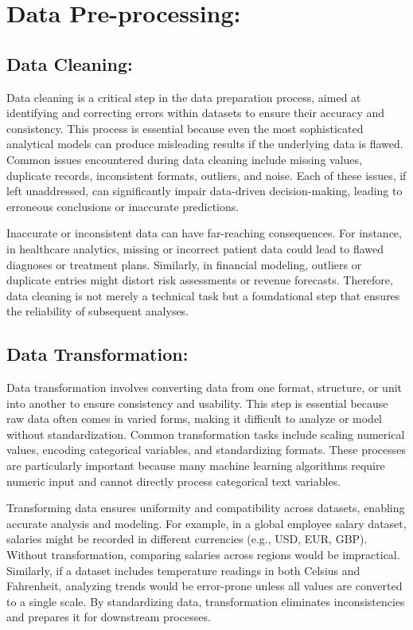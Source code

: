 \documentclass[12pt]{article}
\begin{document}
\section{Data Pre-processing:}

\subsection{Data Cleaning:} 
Data cleaning is a critical step in the data preparation process, aimed at identifying and correcting errors within datasets to ensure their accuracy and consistency. This process is essential because even the most sophisticated analytical models can produce misleading results if the underlying data is flawed. Common issues encountered during data cleaning include missing values, duplicate records, inconsistent formats, outliers, and noise. Each of these issues, if left unaddressed, can significantly impair data-driven decision-making, leading to erroneous conclusions or inaccurate predictions.

Inaccurate or inconsistent data can have far-reaching consequences. For instance, in healthcare analytics, missing or incorrect patient data could lead to flawed diagnoses or treatment plans. Similarly, in financial modeling, outliers or duplicate entries might distort risk assessments or revenue forecasts. Therefore, data cleaning is not merely a technical task but a foundational step that ensures the reliability of subsequent analyses.

\subsection{Data Transformation:} 
Data transformation involves converting data from one format, structure, or unit into another to ensure consistency and usability. This step is essential because raw data often comes in varied forms, making it difficult to analyze or model without standardization. Common transformation tasks include scaling numerical values, encoding categorical variables, and standardizing formats. These processes are particularly important because many machine learning algorithms require numeric input and cannot directly process categorical text variables.

Transforming data ensures uniformity and compatibility across datasets, enabling accurate analysis and modeling. For example, in a global employee salary dataset, salaries might be recorded in different currencies (e.g., USD, EUR, GBP). Without transformation, comparing salaries across regions would be impractical. Similarly, if a dataset includes temperature readings in both Celsius and Fahrenheit, analyzing trends would be error-prone unless all values are converted to a single scale. By standardizing data, transformation eliminates inconsistencies and prepares it for downstream processes.
\end{document}
